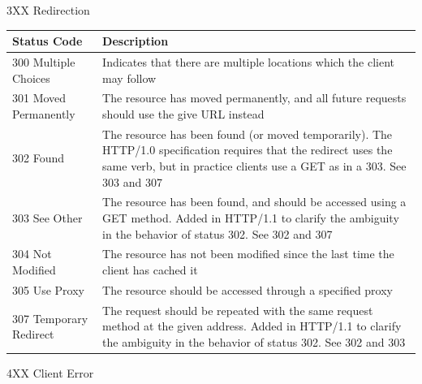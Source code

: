\documentclass[final,table]{beamer}
\begin{document}
\begin{frame}{}
\begin{block}{\huge 3XX Redirection}
      \begin{tabular}{p{} p{}}
        Status Code & Description \\ \hline
        300 Multiple Choices & Indicates that there are multiple locations which the client may follow \\
        301 Moved Permanently & The resource has moved permanently, and all future requests should use the give URL instead \\
        302 Found & The resource has been found (or moved temporarily). The HTTP/1.0 specification requires that the redirect uses the same verb, but in practice clients use a GET as in a 303. See 303 and 307 \\
        303 See Other & The resource has been found, and should be accessed using a GET method. Added in HTTP/1.1 to clarify the ambiguity in the behavior of status 302. See 302 and 307 \\
        304 Not Modified & The resource has not been modified since the last time the client has cached it \\
        305 Use Proxy & The resource should be accessed through a specified proxy \\
        307 Temporary Redirect & The request should be repeated with the same request method at the given address. Added in HTTP/1.1 to clarify the ambiguity in the behavior of status 302. See 302 and 303
      \end{tabular}
    \end{block}
    \begin{block}{\huge 4XX Client Error}

      \vspace{0.3in}


\end{block}
\end{frame}
\end{document}
